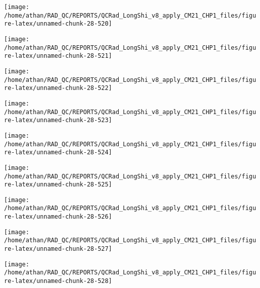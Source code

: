 \documentclass[
  10pt,
  a4paper,oneside]{article}
\begin{document}
\begin{center}\texttt{[image: /home/athan/RAD\_QC/REPORTS/QCRad\_LongShi\_v8\_apply\_CM21\_CHP1\_files/figure-latex/unnamed-chunk-28-520]} \end{center}

\begin{center}\texttt{[image: /home/athan/RAD\_QC/REPORTS/QCRad\_LongShi\_v8\_apply\_CM21\_CHP1\_files/figure-latex/unnamed-chunk-28-521]} \end{center}

\begin{center}\texttt{[image: /home/athan/RAD\_QC/REPORTS/QCRad\_LongShi\_v8\_apply\_CM21\_CHP1\_files/figure-latex/unnamed-chunk-28-522]} \end{center}

\begin{center}\texttt{[image: /home/athan/RAD\_QC/REPORTS/QCRad\_LongShi\_v8\_apply\_CM21\_CHP1\_files/figure-latex/unnamed-chunk-28-523]} \end{center}

\begin{center}\texttt{[image: /home/athan/RAD\_QC/REPORTS/QCRad\_LongShi\_v8\_apply\_CM21\_CHP1\_files/figure-latex/unnamed-chunk-28-524]} \end{center}

\begin{center}\texttt{[image: /home/athan/RAD\_QC/REPORTS/QCRad\_LongShi\_v8\_apply\_CM21\_CHP1\_files/figure-latex/unnamed-chunk-28-525]} \end{center}

\begin{center}\texttt{[image: /home/athan/RAD\_QC/REPORTS/QCRad\_LongShi\_v8\_apply\_CM21\_CHP1\_files/figure-latex/unnamed-chunk-28-526]} \end{center}

\begin{center}\texttt{[image: /home/athan/RAD\_QC/REPORTS/QCRad\_LongShi\_v8\_apply\_CM21\_CHP1\_files/figure-latex/unnamed-chunk-28-527]} \end{center}

\begin{center}\texttt{[image: /home/athan/RAD\_QC/REPORTS/QCRad\_LongShi\_v8\_apply\_CM21\_CHP1\_files/figure-latex/unnamed-chunk-28-528]} \end{center}
\end{document}

